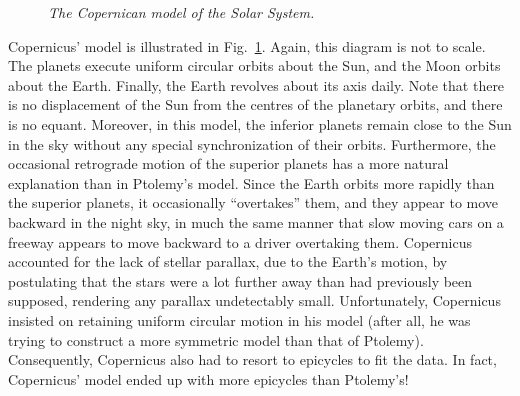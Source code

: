 \begin{figure}
\epsfysize=5.5in
\centerline{}
\caption{\em The Copernican model of the Solar System.}\label{f103}  
\end{figure}

Copernicus' model is illustrated in Fig.~\ref{f103}. Again, this diagram is
not to scale. The planets execute uniform
circular orbits about the Sun, and the Moon orbits about the Earth. Finally, the Earth
revolves about its axis daily. Note that there is no displacement of the Sun from the
centres of the planetary orbits, and there is no equant. Moreover, in this model, the inferior planets
remain close to the Sun in the sky without any special synchronization of their orbits. Furthermore,
the occasional retrograde motion of the superior planets has a more natural explanation than
 in Ptolemy's model. Since the Earth orbits more rapidly than
the superior planets, it occasionally ``overtakes'' them, and they appear to move
backward in the night sky, in much the same manner that  slow moving
cars on a freeway appears to move backward to a driver overtaking them. Copernicus
accounted for the lack of stellar parallax, due to
the Earth's motion,  by postulating that the stars
were a lot further away than had previously been supposed, rendering any parallax undetectably
small. Unfortunately, Copernicus insisted on  retaining  uniform circular motion
in his model (after all, he was trying to construct a more symmetric model than
that of Ptolemy). Consequently, Copernicus also had to resort to epicycles to fit the
data. In fact, Copernicus' model ended up with more epicycles than  Ptolemy's!

